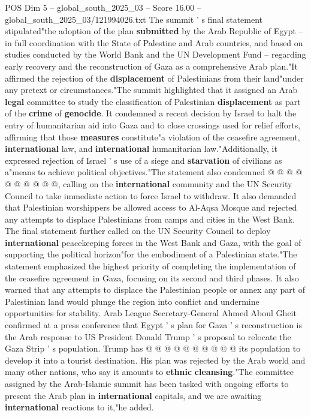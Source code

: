 \begin{textsample}{POS Dim 5 – global\_south\_2025\_03 – Score 16.00 – global\_south\_2025\_03/121994026.txt}  \label{ex:f5_pos_184}
The summit ' s final statement stipulated"the adoption of the plan \textbf{submitted} by the Arab Republic of Egypt -- in full coordination with the State of Palestine and Arab countries, and based on studies conducted by the World Bank and the UN Development Fund -- regarding early recovery and the reconstruction of Gaza as a comprehensive Arab plan."It affirmed the rejection of the \textbf{displacement} of Palestinians from their land"under any pretext or circumstances."The summit highlighted that it assigned an Arab \textbf{legal} committee to study the classification of Palestinian \textbf{displacement} as part of the \textbf{crime} of \textbf{genocide}.
It condemned a recent decision by Israel to halt the entry of humanitarian aid into Gaza and to close crossings used for relief efforts, affirming that those \textbf{measures} constitute"a violation of the ceasefire agreement, \textbf{international} law, and \textbf{international} humanitarian law."Additionally, it expressed rejection of Israel ' s use of a siege and \textbf{starvation} of civilians as a"means to achieve political objectives."The statement also condemned @ @ @ @ @ @ @ @ @ @, calling on the \textbf{international} community and the UN Security Council to take immediate action to force Israel to withdraw.
It also demanded that Palestinian worshippers be allowed access to Al-Aqsa Mosque and rejected any attempts to displace Palestinians from camps and cities in the West Bank.
The final statement further called on the UN Security Council to deploy \textbf{international} peacekeeping forces in the West Bank and Gaza, with the goal of supporting the political horizon"for the embodiment of a Palestinian state."The statement emphasized the highest priority of completing the implementation of the ceasefire agreement in Gaza, focusing on its second and third phases.
It also warned that any attempts to displace the Palestinian people or annex any part of Palestinian land would plunge the region into conflict and undermine opportunities for stability.
Arab League Secretary-General Ahmed Aboul Gheit confirmed at a press conference that Egypt ' s plan for Gaza ' s reconstruction is the Arab response to US President Donald Trump ' s proposal to relocate the Gaza Strip ' s population.
Trump has @ @ @ @ @ @ @ @ @ @ its population to develop it into a tourist destination.
His plan was rejected by the Arab world and many other nations, who say it amounts to \textbf{ethnic} \textbf{cleansing}."The committee assigned by the Arab-Islamic summit has been tasked with ongoing efforts to present the Arab plan in \textbf{international} capitals, and we are awaiting \textbf{international} reactions to it,"he added.

\end{textsample}
